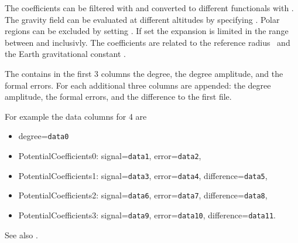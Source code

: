 The coefficients can be filtered with  and converted
to different functionals with . The gravity field can be evaluated at
different altitudes by specifying . Polar regions can be excluded
by setting . If set the expansion is limited in the range between 
and  inclusivly. The coefficients are related to the reference radius~
and the Earth gravitational constant .

The  contains in the first 3 columns the degree, the degree amplitude, and
the formal errors. For each additional  three columns
are appended: the degree amplitude, the formal errors, and the difference to the first file.

For example the data columns for 4  are
\begin{itemize}
\item degree=\verb|data0|
\item PotentialCoefficients0: signal=\verb|data1|, error=\verb|data2|,
\item PotentialCoefficients1: signal=\verb|data3|, error=\verb|data4|,  difference=\verb|data5|,
\item PotentialCoefficients2: signal=\verb|data6|, error=\verb|data7|,  difference=\verb|data8|,
\item PotentialCoefficients3: signal=\verb|data9|, error=\verb|data10|, difference=\verb|data11|.
\end{itemize}

See also .


